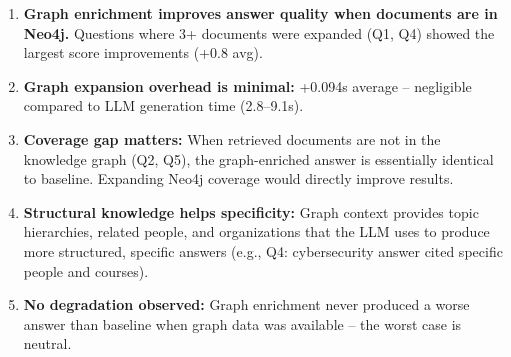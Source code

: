 \documentclass[11pt,a4paper]{article}
\begin{document}
\begin{enumerate}
\item \textbf{Graph enrichment improves answer quality when documents are in Neo4j.} Questions where 3+ documents were expanded (Q1, Q4) showed the largest score improvements (+0.8 avg).

\item \textbf{Graph expansion overhead is minimal:} +0.094s average -- negligible compared to LLM generation time (2.8--9.1s).

\item \textbf{Coverage gap matters:} When retrieved documents are not in the knowledge graph (Q2, Q5), the graph-enriched answer is essentially identical to baseline. Expanding Neo4j coverage would directly improve results.

\item \textbf{Structural knowledge helps specificity:} Graph context provides topic hierarchies, related people, and organizations that the LLM uses to produce more structured, specific answers (e.g., Q4: cybersecurity answer cited specific people and courses).

\item \textbf{No degradation observed:} Graph enrichment never produced a worse answer than baseline when graph data was available -- the worst case is neutral.
\end{enumerate}
\end{document}
